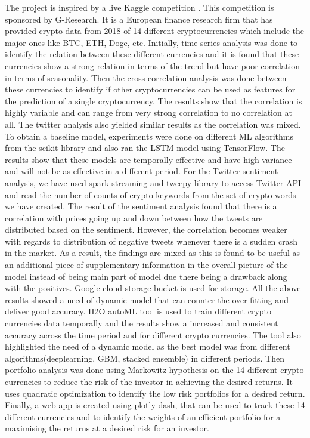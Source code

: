 \documentclass[final]{cvpr}
\begin{document}
 The project is inspired by a live Kaggle competition \cite{kaggle}. This competition is sponsored by G-Research. It is a European finance research firm that has provided crypto data from 2018 of 14 different cryptocurrencies which include the major ones like BTC, ETH, Doge, etc. Initially, time series analysis was done to identify the relation between these different currencies and it is found that these currencies show a strong relation in terms of the trend but have poor correlation in terms of seasonality. Then the cross correlation analysis was done between these currencies to identify if other cryptocurrencies can be used as features for the prediction of a single cryptocurrency. The results show that the correlation is highly variable and can range from very strong correlation to no correlation at all. The twitter analysis also yielded similar results as the correlation was mixed. To obtain a baseline model, experiments were done on different ML algorithms from the scikit library and also ran the LSTM model using TensorFlow. The results show that these models are temporally effective and have high variance and will not be as effective in a different period. For the Twitter sentiment analysis, we have used spark streaming and tweepy library to access Twitter API and read the number of counts of crypto keywords from the set of crypto words we have created. The result of the sentiment analysis found that there is a correlation with prices going up and down between how the tweets are distributed based on the sentiment. However, the correlation becomes weaker with regards to distribution of negative tweets whenever there is a sudden crash in the market. As a result, the findings are mixed as this is found to be useful as an additional piece of supplementary information in the overall picture of the model instead of being main part of model due there being a drawback along with the positives. Google cloud storage bucket is used for storage. All the above results showed a need of dynamic model that can counter the over-fitting and deliver good accuracy. H2O autoML tool is used to train different crypto currencies data temporally and the results show a increased and consistent accuracy across the time period and for different crypto currencies. The tool also highlighted the need of a dynamic model as the best model was from different algorithms(deeplearning, GBM, stacked ensemble) in different periods. Then portfolio analysis was done using Markowitz hypothesis on the 14 different crypto currencies to reduce the risk of the investor in achieving the desired returns. It uses quadratic optimization to identify the low risk portfolios for a desired return. Finally, a web app is created using plotly dash, that can be used to track these 14 different currencies and to identify the weights of an efficient portfolio for a maximising the returns at a desired risk for an investor.
\end{document}
